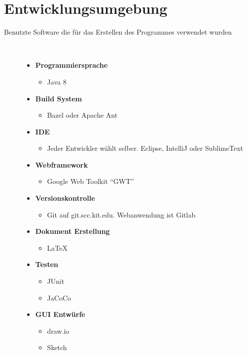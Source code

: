 \documentclass[parskip=full,11pt,twoside]{scrartcl}
\begin{document}
\section{Entwicklungsumgebung}
  \begin{description}
	\item[Benutzte Software die für das Erstellen des Programmes verwendet wurden]~\par
	\begin{itemize}
		\item \textbf{Programmiersprache}
		\begin{itemize}
			\item Java 8
		\end{itemize}
		\item \textbf{Build System}
		\begin{itemize}
			\item Bazel oder Apache Ant
		\end{itemize}
		\item \textbf{IDE}
		\begin{itemize}
			\item Jeder Entwickler wählt selber. Eclipse, IntelliJ oder SublimeText
		\end{itemize}
		\item \textbf{Webframework}
		\begin{itemize}
			\item Google Web Toolkit \enquote{GWT}
		\end{itemize}
		\item \textbf{Versionskontrolle}
		\begin{itemize}
			\item Git auf git.scc.kit.edu. Webanwendung ist Gitlab
		\end{itemize}
		\item \textbf{Dokument Erstellung}
		\begin{itemize}
			\item LaTeX
		\end{itemize}
		\item \textbf{Testen}
		\begin{itemize}
			\item JUnit
			\item JaCoCo
		\end{itemize}
		\item \textbf{GUI Entwürfe}
			\begin{itemize}
				\item draw.io
				\item Sketch
			\end{itemize}

\end{itemize}
\end{description}
\end{document}
